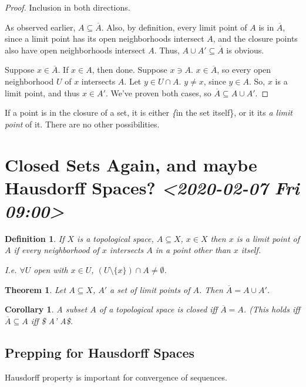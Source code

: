 \documentclass[11pt]{article}
\newtheorem{theorem}{Theorem}[section]
\newtheorem{definition}{Definition}[section]
\newtheorem{corollary}{Corollary}[section]
\begin{document}
\begin{proof}
Inclusion in both directions. 

As observed earlier, \(A \subseteq \overline{A}\). Also, by definition,
every limit point of \(A\) is in \(\overline{A}\), since a limit point has
its open neighborhoods intersect \(A\), and the closure points also have
open neighborhoods intersect \(A\). Thus, \(A\cup A' \subseteq \overline{A}\) is
obvious.

Suppose \(x \in \overline{A}\). If \(x \in A\), then done. Suppose \(x \ni
A\). \(x \in \overline{A}\), so every open neighborhood \(U\) of \(x\)
intersects \(A\). Let \(y \in U\cap A\). \(y\not = x\), since \(y \in A\). So,
\(x\) is a limit point, and thus \(x \in A'\). We've proven both cases, so
\(\overline{A} \subseteq A\cup A'\).
\end{proof}

If a point is in the closure of a set, it is either \textit\{in the set
itself\}, or it its \textit{a limit point} of it. There are no other
possibilities.

\section{Closed Sets Again, and maybe Hausdorff Spaces? \textit{<2020-02-07 Fri 09:00>}}
\label{sec:org5839cb4}
\begin{definition}
If \(X\) is a topological space, \(A\subseteq X\), \(x \in X\) then \(x\) is a
limit point of \(A\) if every neighborhood of \(x\) intersects \(A\) in a
point other than \(x\) itself.

I.e. \(\forall U\) open with \(x \in U\), \((U\setminus\{x\})\cap A
\not=\emptyset\).
\end{definition}

\begin{theorem}
Let \(A\subseteq X\), \(A'\) a set of limit points of \(A\). Then
\(\overline{A} = A\cup A'\).
\end{theorem}

\begin{corollary}
A subset \(A\) of a topological space is closed iff \(\overline{A} =
A\). (This holds iff \(\overline{A} \subseteq A\) iff \$ A' \subseteq A\$.
\end{corollary}

\subsection{Prepping for Hausdorff Spaces}
\label{sec:orgea3cdef}
Hausdorff property is important for convergence of sequences.
\end{document}
